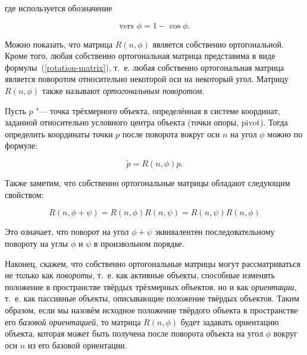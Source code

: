 \noindent где используется обозначение

$$\textrm{vers }\phi=1-\cos \phi.$$

Можно показать, что матрица $R(n,\phi)$ является собственно ортогональной. Кроме того, любая собственно ортогональная
матрица представима в виде формулы~(\ref{rotation-matrix}), т.~е. любая собственно ортогональная матрица
является поворотом относительно некоторой оси на некоторый угол. Матрицу $R(n,\phi)$ также называют
\textit{ортогональным поворотом}.

Пусть $p$ "--- точка трёхмерного объекта, определённая в системе координат, заданной относительно условного центра
объекта (точки опоры, pivot). Тогда определить координаты точки $p$ после поворота вокруг оси $n$ на угол $\phi$
можно по формуле:

$$
\tilde p=R(n,\phi)p.
$$

Также заметим, что собственно ортогональные матрицы обладают следующим свойством:

$$
R(n,\phi+\psi)=R(n,\phi)R(n,\psi)=R(n,\psi)R(n,\phi)
$$

Это означает, что поворот на угол $\phi+\psi$ эквивалентен последовательному повороту на углы $\phi$ и $\psi$ в
произвольном порядке.

Наконец, скажем, что собственно ортогональные матрицы могут рассматриваться не только как \textit{повороты}, т.~е. как
активные объекты, способные изменять положение в пространстве твёрдых трёхмерных объектов, но и как
\textit{ориентации}, т.~е. как пассивные объекты, описывающие положение твёрдых объектов. Таким образом, если мы назовём
исходное положение твёрдого объекта в пространстве его \textit{базовой ориентацией}, то матрица $R(n,\phi)$ будет
задавать ориентацию объекта, которая может быть получена после поворота объекта на угол $\phi$ вокруг оси $n$ из его
базовой ориентации.
